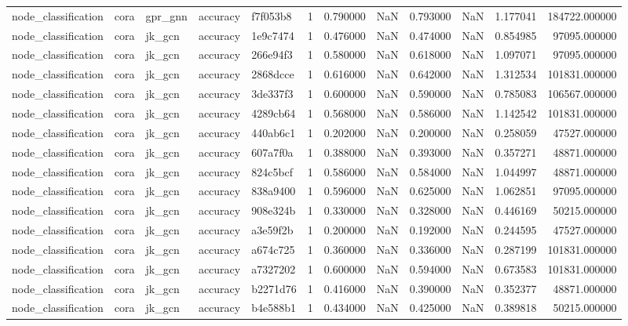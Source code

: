 \begin{tabular}{lllllrrrrrrr}
node_classification & cora & gpr_gnn & accuracy & f7f053b8 & 1 & 0.790000 & NaN & 0.793000 & NaN & 1.177041 & 184722.000000 \\
node_classification & cora & jk_gcn & accuracy & 1e9c7474 & 1 & 0.476000 & NaN & 0.474000 & NaN & 0.854985 & 97095.000000 \\
node_classification & cora & jk_gcn & accuracy & 266e94f3 & 1 & 0.580000 & NaN & 0.618000 & NaN & 1.097071 & 97095.000000 \\
node_classification & cora & jk_gcn & accuracy & 2868dcce & 1 & 0.616000 & NaN & 0.642000 & NaN & 1.312534 & 101831.000000 \\
node_classification & cora & jk_gcn & accuracy & 3de337f3 & 1 & 0.600000 & NaN & 0.590000 & NaN & 0.785083 & 106567.000000 \\
node_classification & cora & jk_gcn & accuracy & 4289cb64 & 1 & 0.568000 & NaN & 0.586000 & NaN & 1.142542 & 101831.000000 \\
node_classification & cora & jk_gcn & accuracy & 440ab6c1 & 1 & 0.202000 & NaN & 0.200000 & NaN & 0.258059 & 47527.000000 \\
node_classification & cora & jk_gcn & accuracy & 607a7f0a & 1 & 0.388000 & NaN & 0.393000 & NaN & 0.357271 & 48871.000000 \\
node_classification & cora & jk_gcn & accuracy & 824c5bcf & 1 & 0.586000 & NaN & 0.584000 & NaN & 1.044997 & 48871.000000 \\
node_classification & cora & jk_gcn & accuracy & 838a9400 & 1 & 0.596000 & NaN & 0.625000 & NaN & 1.062851 & 97095.000000 \\
node_classification & cora & jk_gcn & accuracy & 908e324b & 1 & 0.330000 & NaN & 0.328000 & NaN & 0.446169 & 50215.000000 \\
node_classification & cora & jk_gcn & accuracy & a3e59f2b & 1 & 0.200000 & NaN & 0.192000 & NaN & 0.244595 & 47527.000000 \\
node_classification & cora & jk_gcn & accuracy & a674c725 & 1 & 0.360000 & NaN & 0.336000 & NaN & 0.287199 & 101831.000000 \\
node_classification & cora & jk_gcn & accuracy & a7327202 & 1 & 0.600000 & NaN & 0.594000 & NaN & 0.673583 & 101831.000000 \\
node_classification & cora & jk_gcn & accuracy & b2271d76 & 1 & 0.416000 & NaN & 0.390000 & NaN & 0.352377 & 48871.000000 \\
node_classification & cora & jk_gcn & accuracy & b4e588b1 & 1 & 0.434000 & NaN & 0.425000 & NaN & 0.389818 & 50215.000000 \\

\end{tabular}
